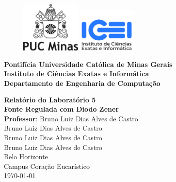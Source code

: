 \thispagestyle{empty} %

\begin{figure}[t]
    \includegraphics[width=3cm]{imagens/logo-puc-minas.png}
    \hspace{0.02\textwidth}
    \vline%
    \hspace{0.04\textwidth}
    \includegraphics[width=3cm]{imagens/logo-icei.jpeg}
\end{figure}

\hrulefill%
\vspace{\baselineskip}

\Large\noindent
\textbf{Pontifícia Universidade Católica de Minas Gerais} \\
\textbf{Instituto de Ciências Exatas e Informática} \\
\textbf{Departamento de Engenharia de Computação}

\begin{center}
    \vfill
    \Huge\textbf{Relatório do Laboratório 5} \\
    \vspace{0.5cm}
    \Large\textbf{Fonte Regulada com Diodo Zener} \\
    \vspace{1cm}
    \large \textbf{Professor}: Bruno Luiz Dias Alves de Castro \\
    \vspace{0.5cm}
    \large Bruno Luiz Dias Alves de Castro \\
    \large Bruno Luiz Dias Alves de Castro \\
    \large Bruno Luiz Dias Alves de Castro \\
    \vfill
    \large Belo Horizonte \\ Campus Coração Eucarístico \\
    \vspace{\baselineskip}
    \large \today
\end{center}